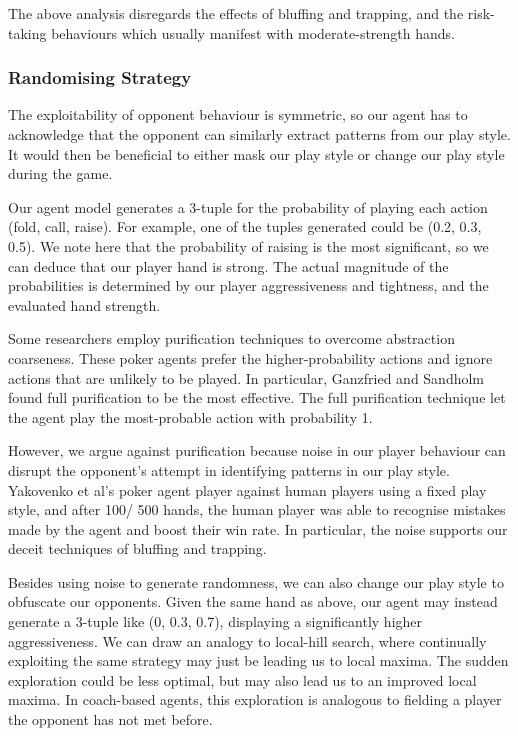 \documentclass{article}
\begin{document}
The above analysis disregards the effects of bluffing and trapping, and the risk-taking behaviours which usually manifest with moderate-strength hands.

\subsubsection{Randomising Strategy}

The exploitability of opponent behaviour is symmetric, so our agent has to acknowledge that the opponent can similarly extract patterns from our play style. It would then be beneficial to either mask our play style or change our play style during the game.

Our agent model generates a 3-tuple for the probability of playing each action (fold, call, raise). For example, one of the tuples generated could be (0.2, 0.3, 0.5). We note here that the probability of raising is the most significant, so we can deduce that our player hand is strong. The actual magnitude of the probabilities is determined by our player aggressiveness and tightness, and the evaluated hand strength.

Some researchers employ purification techniques to overcome abstraction coarseness. These poker agents prefer the higher-probability actions and ignore actions that are unlikely to be played. In particular, Ganzfried and Sandholm found full purification to be the most effective. The full purification technique let the agent play the most-probable action with probability 1.

However, we argue against purification because noise in our player behaviour can disrupt the opponent's attempt in identifying patterns in our play style. Yakovenko et al's poker agent player against human players using a fixed play style, and after 100/ 500 hands, the human player was able to recognise mistakes made by the agent and boost their win rate. In particular, the noise supports our deceit techniques of bluffing and trapping.

Besides using noise to generate randomness, we can also change our play style to obfuscate our opponents. Given the same hand as above, our agent may instead generate a 3-tuple like (0, 0.3, 0.7), displaying a significantly higher aggressiveness. We can draw an analogy to local-hill search, where continually exploiting the same strategy may just be leading us to local maxima. The sudden exploration could be less optimal, but may also lead us to an improved local maxima. In coach-based agents, this exploration is analogous to fielding a player the opponent has not met before.
\end{document}
